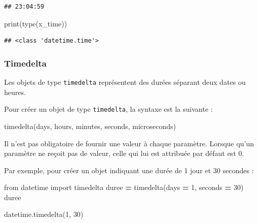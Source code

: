 \documentclass[12pt,]{book}
\newenvironment{Shaded}{\begin{snugshade}}{\end{snugshade}}
\newcommand{\DecValTok}[1]{\textcolor[rgb]{0.00,0.00,0.81}{#1}}
\newcommand{\ImportTok}[1]{#1}
\newcommand{\OperatorTok}[1]{\textcolor[rgb]{0.81,0.36,0.00}{\textbf{#1}}}
\newcommand{\BuiltInTok}[1]{#1}
\newcommand{\NormalTok}[1]{#1}
\numberwithin{equation}{section}
\numberwithin{countremarque}{section}
\begin{document}
\begin{lstlisting}
## 23:04:59
\end{lstlisting}

\begin{Shaded}
\begin{Highlighting}[]
\BuiltInTok{print}\NormalTok{(}\BuiltInTok{type}\NormalTok{(x_time))}
\end{Highlighting}
\end{Shaded}

\begin{lstlisting}
## <class 'datetime.time'>
\end{lstlisting}

\subsubsection{Timedelta}\label{timedelta}

Les objets de type \texttt{timedelta} représentent des durées séparant
deux dates ou heures.

Pour créer un objet de type \texttt{timedelta}, la syntaxe est la
suivante :

\begin{Shaded}
\begin{Highlighting}[]
\NormalTok{timedelta(days, hours, minutes, seconds, microseconds)}
\end{Highlighting}
\end{Shaded}

Il n'est pas obligatoire de fournir une valeur à chaque paramètre.
Lorsque qu'un paramètre ne reçoit pas de valeur, celle qui lui est
attribuée par défaut est 0.

Par exemple, pour créer un objet indiquant une durée de 1 jour et 30
secondes :

\begin{Shaded}
\begin{Highlighting}[]
\ImportTok{from}\NormalTok{ datetime }\ImportTok{import}\NormalTok{ timedelta}
\NormalTok{duree }\OperatorTok{=}\NormalTok{ timedelta(days }\OperatorTok{=} \DecValTok{1}\NormalTok{, seconds }\OperatorTok{=} \DecValTok{30}\NormalTok{)}
\NormalTok{duree}
\end{Highlighting}
\end{Shaded}

\begin{Shaded}
\begin{Highlighting}[]
\NormalTok{datetime.timedelta(}\DecValTok{1}\NormalTok{, }\DecValTok{30}\NormalTok{)}
\end{Highlighting}
\end{Shaded}
\end{document}
